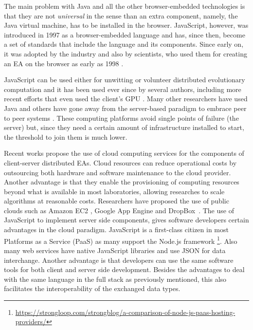 \documentclass[journal,onecolumn]{IEEEtran}
\begin{document}
The main problem with Java and all the other browser-embedded
technologies is that they are not {\em universal} in the
sense than an extra component, namely, the Java virtual machine, has
to be installed in the browser. JavaScript, however,
\cite{flanagan2006javascript} was introduced in 1997 as a
browser-embedded language and has, since then, become a set of standards
\cite{ECMA-262} that include the language and its components. Since
early on, it was adopted by the industry and also by scientists,
who used them for creating an EA on
the browser as early as 1998 \cite{jj-ppsn98}. 

JavaScript can be used either for unwitting
\cite{unwitting-ec} or volunteer
\cite{langdon:2005:metas,gecco07:workshop:dcor} distributed
evolutionary computation and it has been used ever since by several
authors, including more recent efforts \cite{Desell:2008:AHG:1389095.1389273,duda2013distributed,DBLP:journals/corr/abs-0801-1210} that even
used the client's GPU \cite{duda2013gpu}. Many other researchers have
used Java \cite{chong:1999:jDGPi} and others have gone away from the
server-based paradigm to embrace peer to peer systems
\cite{jin2006constructing,10.1109/ICICSE.2008.99}. These computing
platforms avoid single points of failure (the server) but, since they
need a certain amount of infrastructure installed to start, the
threshold to join them is much lower. 

Recent works propose the use of cloud computing services for the components of 
client-server distributed EAs. Cloud resources 
can reduce operational costs by outsourcing both hardware and software maintenance 
to the cloud provider. Another advantage is that they enable the provisioning of computing resources beyond what 
is available in most laboratories, allowing researches to 
scale algorithms at reasonable costs. Researchers have proposed the use of 
public clouds such as Amazon EC2 \cite{CloudScale}, Google App Engine\cite{di2013towards} 
and DropBox~\cite{mericloud}. The use of JavaScript to implement server side components, %
gives software developers certain advantages in the cloud paradigm. JavaScript is a first-class citizen
in most Platforms as a Service (PaaS) as many support the Node.js framework 
\footnote{\url{https://strongloop.com/strongblog/a-comparison-of-node-js-paas-hosting-providers/}}. Also many web services %
have native JavaScript libraries and use JSON for data interchange. Another advantage is that 
developers can use the same software tools for both client and server side development. 
Besides the advantages to deal with the same language in the full stack as previously mentioned, 
this also facilitates the interoperability of the exchanged data types.
\end{document}
